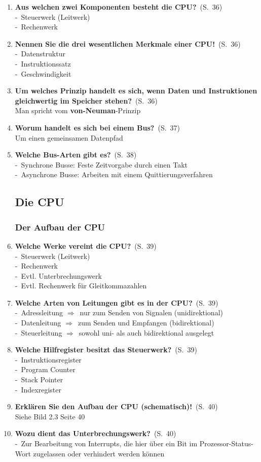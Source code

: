 \documentclass[a4paper,12pt]{article}
\newcommand{\question}[3]{\pagebreak[3]\item {\textbf{#1?}}\ (S.\ #2)#3}
\newcommand{\statement}[3]{\pagebreak[3]\item {\textbf{#1!}}\ (S.\ #2)#3}
\newcommand{\catchword}[1]{\\-\ #1}
\newcommand{\normaltext}[1]{\\#1}
\newcommand{\resultol}[1]{$\Rightarrow$\ #1}
\newcommand{\page}[1]{#1}
\newcommand{\important}[1]{\textbf{#1}}
\begin{document}
\begin{enumerate}
  \question{Aus welchen zwei Komponenten besteht die CPU}{\page{36}}
  {
    \catchword{Steuerwerk (Leitwerk)}
    \catchword{Rechenwerk}
  }

  \statement{Nennen Sie die drei wesentlichen Merkmale einer CPU}{\page{36}}
  {
    \catchword{Datenstruktur}
    \catchword{Instruktionssatz}
    \catchword{Geschwindigkeit}
  }

  \question{Um welches Prinzip handelt es sich, wenn Daten und Instruktionen gleichwertig
            im Speicher stehen}{\page{36}}
  {
    \normaltext{Man spricht vom \important{von-Neuman}-Prinzip}
  }

  \question{Worum handelt es sich bei einem Bus}{\page{37}}
  {
    \normaltext{Um einen gemeinsamen Datenpfad}
  }

  \question{Welche Bus-Arten gibt es}{\page{38}}
  {
    \catchword{Synchrone Busse: Feste Zeitvorgabe durch einen Takt}
    \catchword{Asynchrone Busse: Arbeiten mit einem Quittierungsverfahren}
  }

  \subsection{Die CPU}

  \subsubsection{Der Aufbau der CPU}

  \question{Welche Werke vereint die CPU}{\page{39}}
  {
    \catchword{Steuerwerk (Leitwerk)}
    \catchword{Rechenwerk}
    \catchword{Evtl. Unterbrechungswerk}
    \catchword{Evtl. Rechenwerk für Gleitkommazahlen}
  }

  \question{Welche Arten von Leitungen gibt es in der CPU}{\page{39}}
  {
    \catchword{Adressleitung \resultol{nur zum Senden von Signalen (unidirektional)}}
    \catchword{Datenleitung \resultol{zum Senden und Empfangen (bidirektional)}}
    \catchword{Steuerleitung \resultol{sowohl uni- als auch bidirektional ausgelegt}}
  }

  \question{Welche Hilfregister besitzt das Steuerwerk}{\page{39}}
  {
    \catchword{Instruktionsregister}
    \catchword{Program Counter}
    \catchword{Stack Pointer}
    \catchword{Indexregister}
  }

  \statement{Erklären Sie den Aufbau der CPU (schematisch)} {\page{40}}
  {
    \normaltext{Siehe Bild 2.3 Seite 40}
  }

  \question{Wozu dient das Unterbrechungswerk}{\page{40}}
  {
    \catchword{Zur Bearbeitung von Interrupts, die hier über ein Bit im
               Prozessor-Status-Wort zugelassen oder verhindert werden können}
  }


\end{enumerate}
\end{document}
